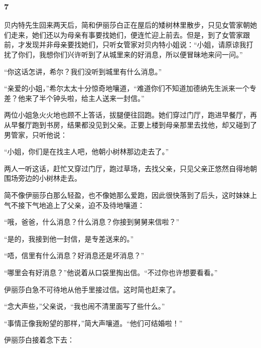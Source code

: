 \subsubsection*{7}

\par 贝内特先生回来两天后，简和伊丽莎白正在屋后的矮树林里散步，只见女管家朝她们走来，她们还以为母亲有事要找她们，便连忙迎上前去。但是，到了女管家跟前，才发现并非母亲要找她们，只听女管家对贝内特小姐说：“小姐，请原谅我打扰了你们，我想你们兴许听到了从城里来的好消息，所以便冒昧地来问一问。”
\par “你这话怎讲，希尔？我们没听到城里有什么消息。”
\par “亲爱的小姐，”希尔太太十分惊奇地嚷道，“难道你们不知道加德纳先生派来一个专差？他来了半个钟头啦，给主人送来一封信。”
\par 两位小姐急火火地也顾不上答话，拔腿便往回跑。她们穿过门厅，跑进早餐厅，再从早餐厅跑到书房，结果都没见到父亲。正要上楼到母亲那里去找他，却又碰到了男管家，只听他说：
\par “小姐，你们是在找主人吧，他朝小树林那边走去了。”
\par 两人一听这话，赶忙又穿过门厅，跑过草场，去找父亲，只见父亲正悠然自得地朝围场旁边的小树林走去。
\par 简不像伊丽莎白那么轻盈，也不像她那么爱跑，因此很快落到了后头，这时妹妹上气不接下气地追上了父亲，迫不及待地嚷道：
\par “哦，爸爸，什么消息？什么消息？你接到舅舅来信啦？”
\par “是的，我接到他一封信，是专差送来的。”
\par “唔，信里有什么消息？好消息还是坏消息？”
\par “哪里会有好消息？”他说着从口袋里掏出信。“不过你也许想要看看。”
\par 伊丽莎白急不可待地从他手里接过信。这时简也赶来了。
\par “念大声些，”父亲说，“我也闹不清里面写了些什么。”
\par “事情正像我盼望的那样，”简大声嚷道。“他们可结婚啦！”
\par 伊丽莎白接着念下去：
